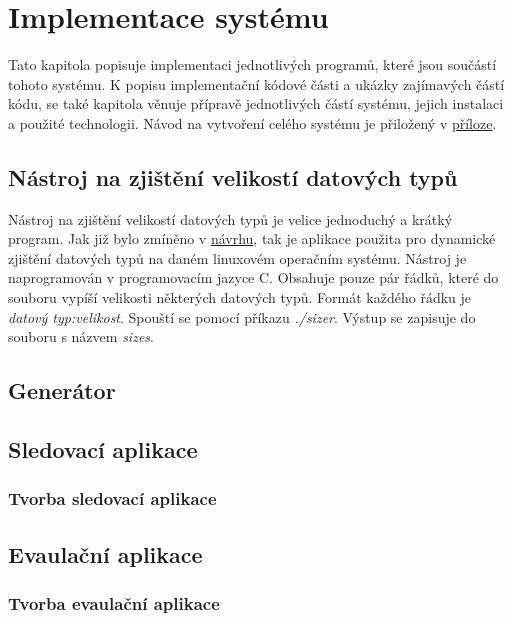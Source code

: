 \chapter{Implementace systému
\label{sec:ImplementaceSystemu}}

\iffalse

dodelat do programu:
zachytavat comma a tim zjistit ktere procesy to vyvolavaji

sizer = k cemu je, struktura formatu jeho vystupu
generator
track
    - rozdeleni na kernel a user cast
    data structure alligment
    debugovani pomoci sys/kernel/debug/tracing/trace_pipe
evaulator
cmake
    = vypsat vsechny dulezite veci co se tam pouzivaji jako vmlinux a prepinace
velky vystupni soubor
pripadne problemy

\fi

Tato kapitola popisuje implementaci jednotlivých programů, které jsou součástí tohoto systému. K popisu implementační kódové části a ukázky zajímavých částí kódu, se také kapitola věnuje přípravě jednotlivých částí systému, jejich instalaci a použité technologii. Návod na vytvoření celého systému je přiložený v \hyperref[sec:Prikazy]{příloze}.

\section{Nástroj na zjištění velikostí datových typů}

Nástroj na zjištění velikostí datových typů je velice jednoduchý a krátký program. Jak již bylo zmíněno v \hyperref[sec:NavrhSystemu]{návrhu}, tak je aplikace použita pro dynamické zjištění datových typů na daném linuxovém operačním systému. Nástroj je naprogramován v programovacím jazyce C. Obsahuje pouze pár řádků, které do souboru vypíší velikosti některých datových typů. Formát každého řádku je \emph{datový typ:velikost}. Spouští se pomocí příkazu \emph{./sizer}. Výstup se zapisuje do souboru s názvem \emph{sizes}. 

\section{Generátor}

\section{Sledovací aplikace}

\subsection{Tvorba sledovací aplikace}

\iffalse
pragma pack == data structure alligment
\fi

\section{Evaulační aplikace}

\subsection{Tvorba evaulační aplikace}
